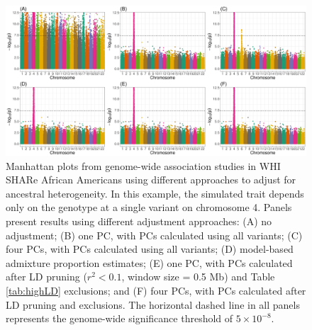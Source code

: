 \documentclass[12pt]{article}
\begin{document}
\begin{figure}
\includegraphics[width=\textwidth]{figs/manhattan/WHI_manh_gwas_70}
\caption{Manhattan plots from genome-wide association studies in WHI SHARe African Americans using different approaches to adjust for ancestral heterogeneity. In this example, the simulated trait depends only on the genotype at a single variant on chromosome 4. Panels present results using different adjustment approaches: (A) no adjustment; (B) one PC, with PCs calculated using all variants; (C) four PCs, with PCs calculated using all variants; (D) model-based admixture proportion estimates; (E) one PC, with PCs calculated after LD pruning ($r^2 < 0.1$, window size = 0.5 Mb) and Table \ref{tab:highLD} exclusions; and (F) four PCs, with PCs calculated after LD pruning and exclusions. The horizontal dashed line in all panels represents the genome-wide significance threshold of $5 \times 10^{-8}$.}
\label{fig:manh}
\end{figure}
\end{document}
